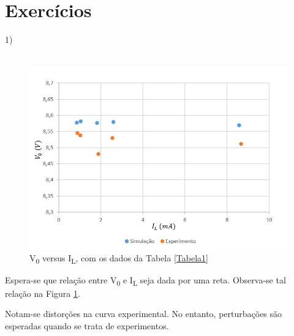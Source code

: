 \documentclass[journal, a4paper]{IEEEtran}
\begin{document}
\section{Exercícios}
\vspace{-0.8 cm}
	1)
\\~\\
\vspace{-1.3 cm}
        \begin{figure}[H]
		    \begin{center}
		    \includegraphics[width=\columnwidth]{Curva_exercicio1.png}
    		\caption{V\textsubscript{0} versus I\textsubscript{L}, com os dados da Tabela \ref{Tabela1}}
		    \label{curva1}
		    \end{center}
	    \end{figure}
	    
   \tab Espera-se que relação entre V\textsubscript{0} e I\textsubscript{L} seja dada por uma reta. Observa-se tal relação na Figura \ref{curva1}.
   
   \tab Notam-se distorções na curva experimental. No entanto, perturbações são esperadas quando se trata de experimentos. 
   
\end{document}
